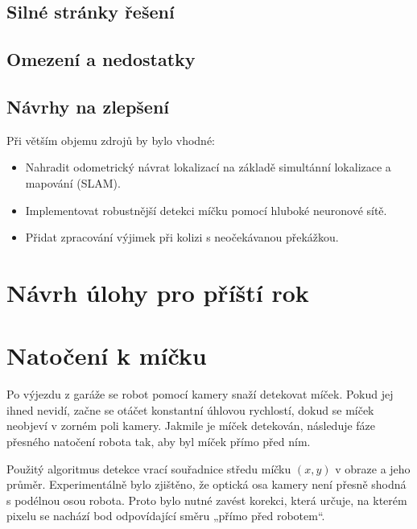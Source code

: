 \documentclass[12pt, a4paper, oneside]{article}
\begin{document}
\subsection{Silné stránky řešení}

\subsection{Omezení a nedostatky}

\subsection{Návrhy na zlepšení}

Při větším objemu zdrojů by bylo vhodné:

\begin{itemize}
  \item Nahradit odometrický návrat lokalizací na základě simultánní lokalizace
        a mapování (SLAM).
  \item Implementovat robustnější detekci míčku pomocí hluboké neuronové sítě.
  \item Přidat zpracování výjimek při kolizi s neočekávanou překážkou.
\end{itemize}

\section{Návrh úlohy pro příští rok}
\label{sec:navrh}


\section{Natočení k míčku}
\label{sec:alignment_ball}

Po výjezdu z garáže se robot pomocí kamery snaží detekovat míček. Pokud jej ihned nevidí, začne se otáčet konstantní úhlovou rychlostí, dokud se míček neobjeví v zorném poli kamery. Jakmile je míček detekován, následuje fáze přesného natočení robota tak, aby byl míček přímo před ním.

Použitý algoritmus detekce vrací souřadnice středu míčku $(x, y)$ v obraze a jeho průměr. Experimentálně bylo zjištěno, že optická osa kamery není přesně shodná s podélnou osou robota. Proto bylo nutné zavést korekci, která určuje, na kterém pixelu se nachází bod odpovídající směru „přímo před robotem“.
\end{document}
